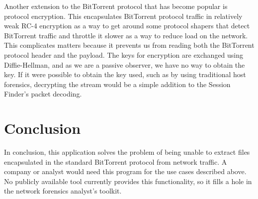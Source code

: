 \documentclass{acm_proc_article-sp}
\begin{document}
Another extension to the BitTorrent protocol that has become popular is protocol
encryption.  This encapsulates BitTorrent protocol traffic in relatively weak
RC-4 encryption as a way to get around some protocol shapers that detect
BitTorrent traffic and throttle it slower as a way to reduce load on the
network. This complicates matters because it prevents us from reading both the
BitTorrent protocol header and the payload. The keys for encryption are
exchanged using Diffie-Hellman, and as we are a passive observer, we have no way
to obtain the key.  If it were possible to obtain the key used, such as by using
traditional host forensics, decrypting the stream would be a simple addition to
the Session Finder's packet decoding.

\section{Conclusion}
In conclusion, this application solves the problem of being unable to extract
files encapsulated in the standard BitTorrent protocol from network traffic.  A
company or analyst would need this program for the use cases described above.
No publicly available tool currently provides this functionality, so it fills a
hole in the network forensics analyst's toolkit.

\nocite{*}


\end{document}
